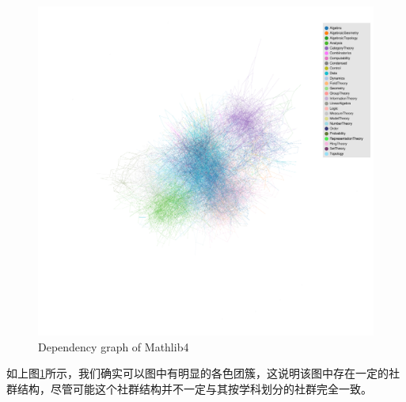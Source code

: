 \begin{figure}[H]
    \centering
    \includegraphics[width=1.0\textwidth]{../img/graph_new.pdf}
    \caption{Dependency graph of Mathlib4}
    \label{fig:dependency}
\end{figure}

如上图\ref{fig:dependency}所示，我们确实可以图中有明显的各色团簇，这说明该图中存在一定的社群结构，尽管可能这个社群结构并不一定与其按学科划分的社群完全一致。

